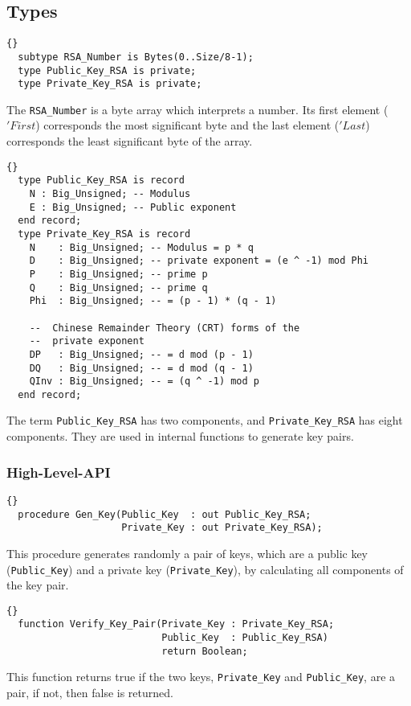 \subsection*{Types}
\begin{lstlisting}{}
  subtype RSA_Number is Bytes(0..Size/8-1);
  type Public_Key_RSA is private;
  type Private_Key_RSA is private;
\end{lstlisting}
The \texttt{RSA\_Number} is a byte array which interprets a
number. Its first element ($'First$) corresponds the most significant
byte and the last element ($'Last$) corresponds the least significant
byte of the array.\\
\begin{lstlisting}{}
  type Public_Key_RSA is record
    N : Big_Unsigned; -- Modulus
    E : Big_Unsigned; -- Public exponent
  end record;
  type Private_Key_RSA is record
    N    : Big_Unsigned; -- Modulus = p * q
    D    : Big_Unsigned; -- private exponent = (e ^ -1) mod Phi
    P    : Big_Unsigned; -- prime p
    Q    : Big_Unsigned; -- prime q
    Phi  : Big_Unsigned; -- = (p - 1) * (q - 1)

    --  Chinese Remainder Theory (CRT) forms of the
    --  private exponent
    DP   : Big_Unsigned; -- = d mod (p - 1)
    DQ   : Big_Unsigned; -- = d mod (q - 1)
    QInv : Big_Unsigned; -- = (q ^ -1) mod p
  end record;
\end{lstlisting}
The term \texttt{Public\_Key\_RSA} has two components, and
\texttt{Private\_Key\_RSA} has eight components. They are used in
internal functions to generate key pairs.\\
\subsubsection*{High-Level-API}
\begin{lstlisting}{}
  procedure Gen_Key(Public_Key  : out Public_Key_RSA;
                    Private_Key : out Private_Key_RSA);
\end{lstlisting}
This procedure generates randomly a pair of keys, which are a public
key (\texttt{Public\_Key}) and a private key (\texttt{Private\_Key}),
by calculating all components of the key pair.\\
\begin{lstlisting}{}
  function Verify_Key_Pair(Private_Key : Private_Key_RSA;
                           Public_Key  : Public_Key_RSA)
                           return Boolean;
\end{lstlisting}
This function returns true if the two keys, \texttt{Private\_Key} and
\texttt{Public\_Key}, are a pair, if not, then false is
returned.

